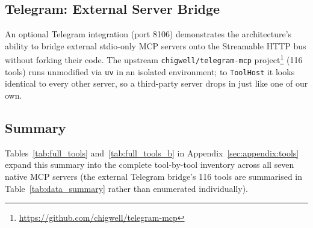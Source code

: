 

\subsection{Telegram: External Server Bridge}\label{sec:data:telegram}

An optional Telegram integration (port 8106) demonstrates the architecture's ability to bridge external stdio-only MCP servers onto the Streamable HTTP bus without forking their code. The upstream \texttt{chigwell/telegram-mcp} project\footnote{\url{https://github.com/chigwell/telegram-mcp}} (116 tools) runs unmodified via \texttt{uv} in an isolated environment; to \texttt{ToolHost} it looks identical to every other server, so a third-party server drops in just like one of our own.

\subsection{Summary}\label{sec:data:summary}



Tables~\ref{tab:full_tools} and~\ref{tab:full_tools_b} in Appendix~\ref{sec:appendix:tools} expand this summary into the complete tool-by-tool inventory across all seven native MCP servers (the external Telegram bridge's 116 tools are summarised in Table~\ref{tab:data_summary} rather than enumerated individually).
